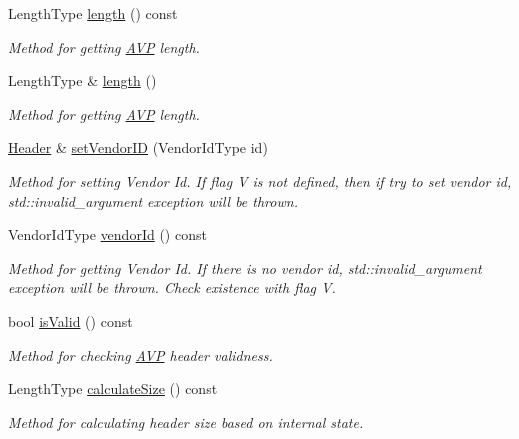 \begin{DoxyCompactItemize}
Length\+Type \hyperlink{classDiameter_1_1AVP_1_1Header_a9a097c1c12f4e81cc47b980a32e2881c}{length} () const
\begin{DoxyCompactList}\small\item\em Method for getting \hyperlink{classDiameter_1_1AVP}{A\+VP} length. \end{DoxyCompactList}\item 
Length\+Type \& \hyperlink{classDiameter_1_1AVP_1_1Header_ab2699d4d3cdc98d9649df77e7a546231}{length} ()
\begin{DoxyCompactList}\small\item\em Method for getting \hyperlink{classDiameter_1_1AVP}{A\+VP} length. \end{DoxyCompactList}\item 
\hyperlink{classDiameter_1_1AVP_1_1Header}{Header} \& \hyperlink{classDiameter_1_1AVP_1_1Header_a08456b4ff0f04b907e24cf090e22ec49}{set\+Vendor\+ID} (Vendor\+Id\+Type id)
\begin{DoxyCompactList}\small\item\em Method for setting Vendor Id. If flag {\ttfamily V} is not defined, then if try to set vendor id, std\+::invalid\+\_\+argument exception will be thrown. \end{DoxyCompactList}\item 
Vendor\+Id\+Type \hyperlink{classDiameter_1_1AVP_1_1Header_ad4d7c49fbcbaed23affaa33a75b518f5}{vendor\+Id} () const
\begin{DoxyCompactList}\small\item\em Method for getting Vendor Id. If there is no vendor id, std\+::invalid\+\_\+argument exception will be thrown. Check existence with flag {\ttfamily V}. \end{DoxyCompactList}\item 
bool \hyperlink{classDiameter_1_1AVP_1_1Header_a9c752aeb95b034a3172367d0da0be0c8}{is\+Valid} () const
\begin{DoxyCompactList}\small\item\em Method for checking \hyperlink{classDiameter_1_1AVP}{A\+VP} header validness. \end{DoxyCompactList}\item 
Length\+Type \hyperlink{classDiameter_1_1AVP_1_1Header_a6bffec09d8dd172535828e2927a2a480}{calculate\+Size} () const
\begin{DoxyCompactList}\small\item\em Method for calculating header size based on internal state. \end{DoxyCompactList}\item 

\end{DoxyCompactItemize}
